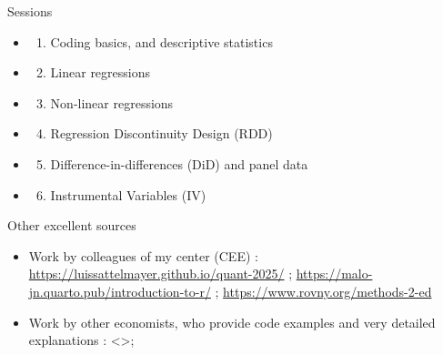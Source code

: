 \documentclass[
  ignorenonframetext,
]{beamer}
\providecommand{\tightlist}{%
  \setlength{\itemsep}{0pt}\setlength{\parskip}{0pt}}
\begin{document}
\begin{frame}{Sessions}
\label{sessions}
\begin{itemize}
\tightlist
\item
  \begin{enumerate}
  \tightlist
  \item
    Coding basics, and descriptive statistics
  \end{enumerate}
\item
  \begin{enumerate}
  \setcounter{enumi}{1}
  \tightlist
  \item
    Linear regressions
  \end{enumerate}
\item
  \begin{enumerate}
  \setcounter{enumi}{2}
  \tightlist
  \item
    Non-linear regressions
  \end{enumerate}
\item
  \begin{enumerate}
  \setcounter{enumi}{3}
  \tightlist
  \item
    Regression Discontinuity Design (RDD)\\
  \end{enumerate}
\item
  \begin{enumerate}
  \setcounter{enumi}{4}
  \tightlist
  \item
    Difference-in-differences (DiD) and panel data
  \end{enumerate}
\item
  \begin{enumerate}
  \setcounter{enumi}{5}
  \tightlist
  \item
    Instrumental Variables (IV)
  \end{enumerate}
\end{itemize}
\end{frame}

\begin{frame}{Other excellent sources}
\label{other-excellent-sources}
\begin{itemize}
\tightlist
\item
  Work by colleagues of my center (CEE) :
  \url{https://luissattelmayer.github.io/quant-2025/} ;
  \url{https://malo-jn.quarto.pub/introduction-to-r/} ;
  \url{https://www.rovny.org/methods-2-ed}
\item
  Work by other economists, who provide code examples and very detailed
  explanations : \textless\textgreater;
\end{itemize}
\end{frame}
\end{document}
